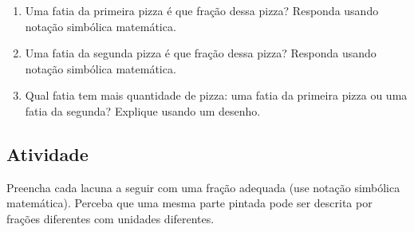 \documentclass[a4,12pt]{book}
\begin{document}
\begin{enumerate} [\quad a)] %
  \item     Uma fatia da primeira pizza é que fração dessa pizza? Responda usando notação simbólica matemática.
  \item     Uma fatia da segunda pizza é que fração dessa pizza? Responda usando notação simbólica matemática.
  \item     Qual fatia tem mais quantidade de pizza: uma fatia da primeira pizza ou uma fatia da segunda? Explique usando um desenho.
\end{enumerate} %

\subsection{Atividade}

Preencha cada lacuna a seguir com uma fração adequada (use notação simbólica matemática). Perceba que uma mesma parte pintada pode ser descrita por frações diferentes com unidades diferentes.

\def \tripa{ (30:4) -- (90:4) -- (150:4)--(210:4)--(270:4)--(330:4) [shift={({4*sqrt(3)},0)}] --(270:4) -- (330:4) [shift={({4*sqrt(3)},0)}]--  (270:4) -- (330:4) -- (30:4) -- (90:4)--(150:4) [shift={({-4*sqrt(3)},0)}] -- (90:4) -- (150:4)--cycle;}
\end{document}
